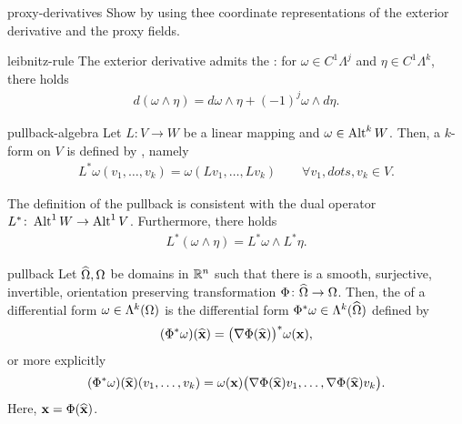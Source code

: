 \begin{Problem}{proxy-derivatives}
  Show  by using thee coordinate
  representations of the exterior derivative and the proxy fields.
\end{Problem}

\begin{Lemma}{leibnitz-rule}
  The exterior derivative admits the : for
  $\omega\in C^1\Lambda^j$ and $\eta\in C^1\Lambda^k$, there holds
  \begin{gather}
    d(\omega\wedge\eta) = d\omega\wedge\eta + (-1)^j\omega\wedge d\eta.
  \end{gather}
\end{Lemma}

\begin{Definition}{pullback-algebra}
  Let $L\colon V\to W$ be a linear mapping and $\omega \in \operatorname{Alt}^k
  W$. Then, a $k$-form on $V$ is defined by , namely
  \begin{gather}
    L^* \omega(v_1,\dots,v_k) = \omega(Lv_1,\dots,Lv_k)
    \qquad\forall v_1,dots,v_k\in V.
  \end{gather}
\end{Definition}

\begin{remark}
  The definition of the pullback is consistent with the dual
  operator $L^*\colon \operatorname{Alt}^1 W \to \operatorname{Alt}^1 V$. Furthermore, there holds
  \begin{gather}
    L^*(\omega\wedge\eta) = L^*\omega \wedge L^*\eta.
  \end{gather}
\end{remark}

\begin{Definition}{pullback}
  Let $\widehat{\Omega},\Omega$ be domains in $\mathbb R^n$ such that there is a
  smooth, surjective, invertible, orientation preserving transformation
  $\Phi\colon \widehat{\Omega} \to \Omega$. Then, the  of a
  differential form $\omega \in\Lambda^k(\Omega)$ is the
  differential form $\Phi^*\omega \in \Lambda^k(\widehat{\Omega})$ defined by
  \begin{gather}
    (\Phi^*\omega)(\widehat{\mathbf x}) = \bigl(\nabla\Phi(\widehat{\mathbf x})\bigr)^*\omega(\mathbf x),
  \end{gather}
  or more explicitly
  \begin{gather}
    (\Phi^*\omega)(\widehat{\mathbf x})(v_1,\dots,v_k)
    = \omega(\mathbf x)\bigl(\nabla\Phi(\widehat{\mathbf x})v_1,\dots,\nabla\Phi(\widehat{\mathbf x})v_k\bigr).
  \end{gather}
  Here, $\mathbf x = \Phi(\widehat{\mathbf x})$.
\end{Definition}

